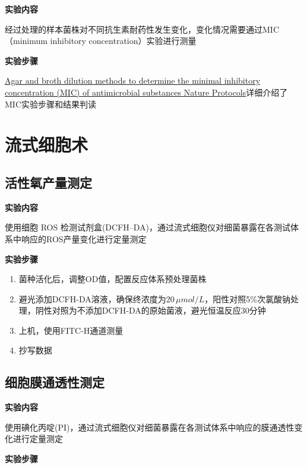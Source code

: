 \documentclass[
]{book}
\providecommand{\tightlist}{%
  \setlength{\itemsep}{0pt}\setlength{\parskip}{0pt}}
\begin{document}
\textbf{实验内容}

经过处理的样本菌株对不同抗生素耐药性发生变化，变化情况需要通过MIC（minimum
inhibitory concentration）实验进行测量

\textbf{实验步骤}

\href{https://www.nature.com/articles/nprot.2007.521}{Agar and broth
dilution methods to determine the minimal inhibitory concentration (MIC)
of antimicrobial substances \textbar{} Nature
Protocols}详细介绍了MIC实验步骤和结果判读

\hypertarget{ux6d41ux5f0fux7ec6ux80deux672f}{%
\section{流式细胞术}\label{ux6d41ux5f0fux7ec6ux80deux672f}}

\hypertarget{ux6d3bux6027ux6c27ux4ea7ux91cfux6d4bux5b9a}{%
\subsection{活性氧产量测定}\label{ux6d3bux6027ux6c27ux4ea7ux91cfux6d4bux5b9a}}

\textbf{实验内容}

使用细胞 ROS
检测试剂盒(DCFH--DA)，通过流式细胞仪对细菌暴露在各测试体系中响应的ROS产量变化进行定量测定

\textbf{实验步骤}

\begin{enumerate}
\def\labelenumi{\arabic{enumi}.}
\tightlist
\item
  菌种活化后，调整OD值，配置反应体系预处理菌株
\item
  避光添加DCFH-DA溶液，确保终浓度为\(20\,\mu mol/L\)，阳性对照5\%次氯酸钠处理，阴性对照为不添加DCFH‐DA的原始菌液，避光恒温反应30分钟
\item
  上机，使用FITC-H通道测量
\item
  抄写数据
\end{enumerate}

\hypertarget{ux7ec6ux80deux819cux901aux900fux6027ux6d4bux5b9a}{%
\subsection{细胞膜通透性测定}\label{ux7ec6ux80deux819cux901aux900fux6027ux6d4bux5b9a}}

\textbf{实验内容}

使用碘化丙啶(PI)，通过流式细胞仪对细菌暴露在各测试体系中响应的膜通透性变化进行定量测定

\textbf{实验步骤}
\end{document}
